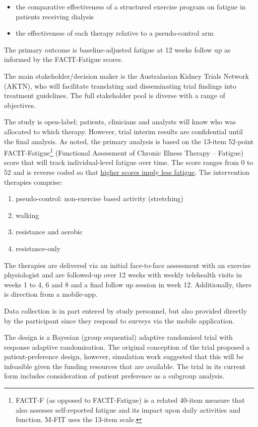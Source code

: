 \documentclass[
]{article}
\begin{document}
\begin{itemize}
\item the comparative effectiveness of a structured exercise program on fatigue in patients receiving dialysis
\item the effectiveness of each therapy relative to a pseudo-control arm
\end{itemize}

The primary outcome is baseline-adjusted fatigue at 12 weeks follow up as informed by the FACIT-Fatigue scores.

The main stakeholder/decision maker is the Australasian Kidney Trials Network (AKTN), who will facilitate translating and disseminating trial findings into treatment guidelines.
The full stakeholder pool is diverse with a range of objectives.

The study is open-label; patients, clinicians and analysts will know who was allocated to which therapy.
However, trial interim results are confidential until the final analysis.
As noted, the primary analysis is based on the 13-item 52-point FACIT-Fatigue\footnote{FACIT-F (as opposed to FACIT-Fatigue) is a related 40-item measure that also assesses self-reported fatigue and its impact upon daily activities and function. M-FIT uses the 13-item scale.} (Functional Assessment of Chronic Illness Therapy – Fatigue) score that will track individual-level fatigue over time.
The score ranges from 0 to 52 and is reverse coded so that \underline{higher scores imply less fatigue}.
The intervention therapies comprise:

\begin{enumerate}
    \item pseudo-control: non-exercise based activity (stretching)
    \item walking
    \item resistance and aerobic
    \item resistance-only
\end{enumerate}

The therapies are delivered via an initial face-to-face assessment with an exercise physiologist and are followed-up over 12 weeks with weekly telehealth visits in weeks 1 to 4, 6 and 8 and a final follow up session in week 12.
Additionally, there is direction from a mobile-app.

Data collection is in part entered by study personnel, but also provided directly by the participant since they respond to surveys via the mobile application.

The design is a Bayesian (group sequential) adaptive randomised trial with response adaptive randomisation.
The original conception of the trial proposed a patient-preference design, however, simulation work suggested that this will be infeasible given the funding resources that are available.
The trial in its current form includes consideration of patient preference as a subgroup analysis.
\end{document}
